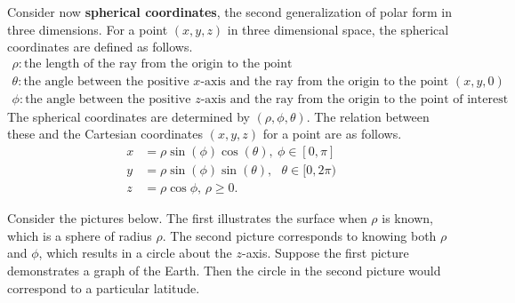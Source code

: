 Consider now \textbf{spherical coordinates}, the second generalization of polar form in three dimensions. For a point $(x,y,z)$ in three dimensional space, the spherical coordinates are defined as follows.
\begin{equation*}
\begin{array}{l}
\rho: \mbox{the length of the ray from the origin to the point}\\
\theta: \mbox{the angle between the positive $x$-axis and the ray from the origin to the point $(x,y,0)$}\\
\phi: \mbox{the angle between the positive $z$-axis and the ray from the origin to the point of interest}
\end{array}
\end{equation*}
The spherical coordinates are determined by $\left( \rho ,\phi
,\theta \right) $. The relation between these and the Cartesian coordinates $\left( x,y,z \right)$ for a point
are as follows.  
\begin{align*}
x& =\rho \sin \left( \phi \right) \cos \left( \theta \right) ,\ \phi \in 
\left[ 0,\pi \right]  \\
y& =\rho \sin \left( \phi \right) \sin \left( \theta \right) ,\text{ }\theta
\in \lbrack 0,2\pi ) \\
z& =\rho \cos \phi \text{, }\rho \geq 0.
\end{align*}

Consider the pictures below. The first illustrates the surface when $\rho$ is known, which is a sphere of radius $\rho$. The second picture corresponds to knowing both $\rho $ and $\phi$, which results in a circle about the $z$-axis. Suppose the first picture demonstrates a graph of the Earth. Then the circle in the second picture would
correspond to a particular latitude. 

\begin{center}
\end{center}

